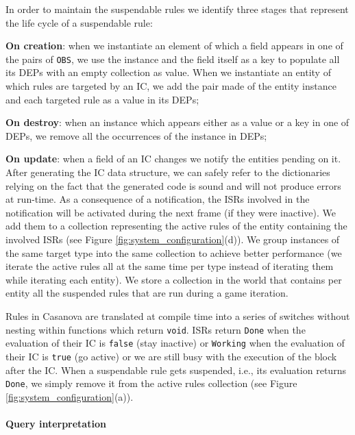 In order to maintain the suspendable rules we identify three stages that represent the life cycle of a suspendable rule:
\begin{inparaenum}[i)]
\item \textbf{On creation}: when we instantiate an element of which a field appears in one of the pairs of \texttt{OBS}, we use the instance and the field itself as a key to populate all its DEPs with an empty collection as value. When we instantiate an entity of which rules are targeted by an IC, we add the pair made of the entity instance and each targeted rule as a value in its DEPs;
\item \textbf{On destroy}: when an instance which appears either as a value or a key in one of DEPs, we remove all the occurrences of the instance in DEPs;
\item \textbf{On update}: when a field of an IC changes we notify the entities pending on it. After generating the IC data structure, we can safely refer to the dictionaries relying on the fact that the generated code is sound and will not produce errors at run-time. As a consequence of a notification, the ISRs involved in the notification will be activated during the next frame (if they were inactive). We add them to a collection representing the active rules of the entity containing the involved ISRs (see Figure \ref{fig:system_configuration}(d)). We group instances of the same target type into the same collection to achieve better performance (we iterate the active rules all at the same time per type instead of iterating them while iterating each entity). We store a collection in the world that contains per entity all the suspended rules that are run during a game iteration.
\end{inparaenum}


Rules in Casanova are translated at compile time into a series of switches without nesting within functions which return \texttt{void}. ISRs return \texttt{Done} when the evaluation of their IC is \texttt{false} (stay inactive) or \texttt{Working} when the evaluation of their IC is \texttt{true} (go active) or we are still busy with the execution of the block after the IC. When a suspendable rule gets suspended, i.e., its evaluation returns \texttt{Done}, we simply remove it from the active rules collection (see Figure \ref{fig:system_configuration}(a)).

\paragraph*{Query interpretation}


